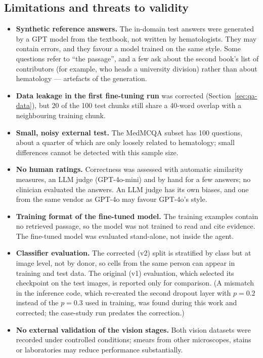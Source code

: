 \subsection{Limitations and threats to validity}\label{sec:limits}

\begin{itemize}
  \item \textbf{Synthetic reference answers.} The in-domain test answers were generated by a GPT model from the textbook, not written by hematologists. They may contain errors, and they favour a model trained on the same style. Some questions refer to ``the passage'', and a few ask about the second book's list of contributors (for example, who heads a university division) rather than about hematology --- artefacts of the generation.
  \item \textbf{Data leakage in the first fine-tuning run} was corrected (Section~\ref{sec:qa-data}), but 20 of the 100 test chunks still share a 40-word overlap with a neighbouring training chunk.
  \item \textbf{Small, noisy external test.} The MedMCQA subset has 100 questions, about a quarter of which are only loosely related to hematology; small differences cannot be detected with this sample size.
  \item \textbf{No human ratings.} Correctness was assessed with automatic similarity measures, an LLM judge (GPT-4o-mini) and by hand for a few answers; no clinician evaluated the answers. An LLM judge has its own biases, and one from the same vendor as GPT-4o may favour GPT-4o's style.
  \item \textbf{Training format of the fine-tuned model.} The training examples contain no retrieved passage, so the model was not trained to read and cite evidence. The fine-tuned model was evaluated stand-alone, not inside the agent.
  \item \textbf{Classifier evaluation.} The corrected (v2) split is stratified by class but at image level, not by donor, so cells from the same person can appear in training and test data. The original (v1) evaluation, which selected its checkpoint on the test images, is reported only for comparison. (A mismatch in the inference code, which re-created the second dropout layer with $p = 0.2$ instead of the $p = 0.3$ used in training, was found during this work and corrected; the case-study run predates the correction.)
  \item \textbf{No external validation of the vision stages.} Both vision datasets were recorded under controlled conditions; smears from other microscopes, stains or laboratories may reduce performance substantially.

\end{itemize}

